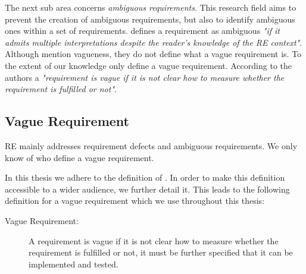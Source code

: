 The next sub area concerns \textit{ambiguous requirements}.
This research field aims to prevent the creation of ambiguous requirements, but also to identify ambiguous ones within a set of requirements.
\Textcite{Kamsties:2000} defines a requirement as ambiguous \textit{"if it admits multiple interpretations despite the reader’s knowledge of the RE context"}.
Although \textcite{Kamsties:2000} mention vagueness, they do not define what a vague requirement is.
To the extent of our knowledge only \textcite{Berry:2003} define a vague requirement.
According to the authors a \textit{"requirement is vague if it is not clear how to measure whether the requirement is fulfilled or not"}.

\subsection{Vague Requirement}
\label{chp:fundamentals:sec:vagueness:subsec:vague_requirement}
\Ac{RE} mainly addresses requirement defects and ambiguous requirements.
We only know of \textcite{Berry:2003} who define a vague requirement.

In this thesis we adhere to the definition of \textcite{Berry:2003}.
In order to make this definition accessible to a wider audience, we further detail it.
This leads to the following definition for a vague requirement which we use throughout this thesis:
\begin{description}
    \item[Vague Requirement:] A requirement is vague if it is not clear how to measure whether the requirement is fulfilled or not, it must be further specified that it can be implemented and tested.
\end{description}
